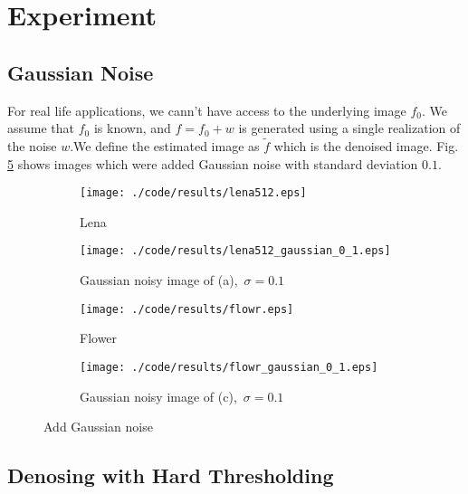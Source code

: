 \documentclass[journal,comsoc]{IEEEtran}
\begin{document}
\section{Experiment}
\label{sec:experiment}

\subsection{Gaussian Noise}
\label{subsec:gaussian-noise}

For real life applications, we cann't have access to the underlying image $f_0$. We assume that $f_0$
is known, and $f=f_0+w$ is generated using a single realization of the noise $w$.We define the estimated image
as $\tilde{f}$ which is the denoised image. Fig. \ref{fig:add-gaussian-noise} shows images which were added Gaussian noise with standard deviation $0.1$. 

\begin{figure}[!htb]
  \centering
  \begin{subfigure}[t]{.25\textwidth}
    \centering
    \texttt{[image: ./code/results/lena512.eps]}
    \caption{Lena}
    \label{subfig:lena}
  \end{subfigure}%
  \begin{subfigure}[t]{.25\textwidth}
    \centering
    \texttt{[image: ./code/results/lena512\_gaussian\_0\_1.eps]}
    \caption{Gaussian noisy image of (a),\ $\sigma=0.1$}
    \label{subfig:gaussian-noisy-image-of-a}
  \end{subfigure}
  \begin{subfigure}[t]{0.25\textwidth}
    \centering
    \texttt{[image: ./code/results/flowr.eps]}
    \caption{Flower}
    \label{subfig:flower}
  \end{subfigure}%
  \begin{subfigure}[t]{0.25\textwidth}
    \centering
    \texttt{[image: ./code/results/flowr\_gaussian\_0\_1.eps]}
    \caption{Gaussian noisy image of (c),\ $\sigma=0.1$}
    \label{subfig:gaussian-noisy-image-of-c}
  \end{subfigure}
  \caption{Add Gaussian noise}
  \label{fig:add-gaussian-noise}
\end{figure}

\subsection{Denosing with Hard Thresholding}
\label{subsec:denosing-with-hard-thresholding}
\end{document}
